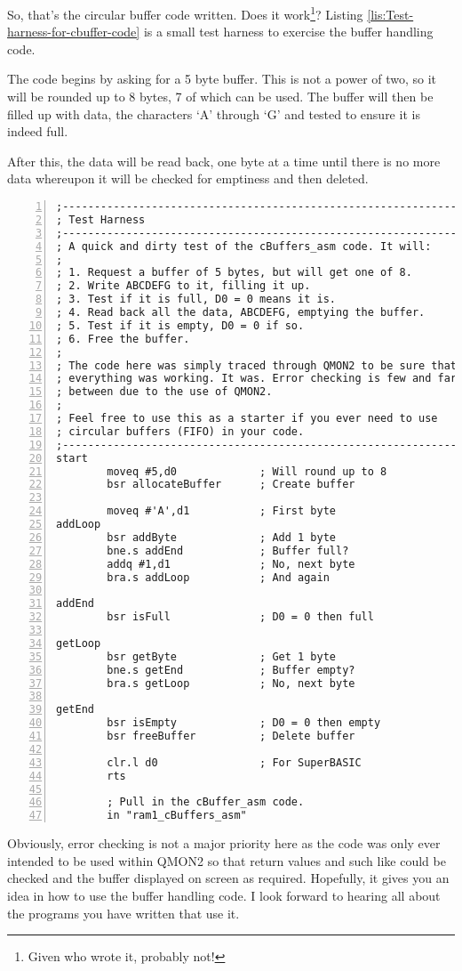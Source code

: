 So, that's the circular buffer code written. Does it work\footnote{Given who wrote it, probably not!}?
Listing \ref{lis:Test-harness-for-cbuffer-code} is a small test harness
to exercise the buffer handling code.

The code begins by asking for a 5 byte buffer. This is not a power
of two, so it will be rounded up to 8 bytes, 7 of which can be used.
The buffer will then be filled up with data, the characters `A'
through `G' and tested to ensure it is indeed full.

After this, the data will be read back, one byte at a time until there
is no more data whereupon it will be checked for emptiness and then
deleted. 

\begin{lstlisting}[caption={Test harness for cBuffer code},label={lis:Test-harness-for-cbuffer-code},numbers=left,showstringspaces=false,tabsize=4]
;--------------------------------------------------------------
; Test Harness
;--------------------------------------------------------------
; A quick and dirty test of the cBuffers_asm code. It will:
;
; 1. Request a buffer of 5 bytes, but will get one of 8.
; 2. Write ABCDEFG to it, filling it up.
; 3. Test if it is full, D0 = 0 means it is.
; 4. Read back all the data, ABCDEFG, emptying the buffer.
; 5. Test if it is empty, D0 = 0 if so.
; 6. Free the buffer.
;
; The code here was simply traced through QMON2 to be sure that
; everything was working. It was. Error checking is few and far
; between due to the use of QMON2. 
;
; Feel free to use this as a starter if you ever need to use
; circular buffers (FIFO) in your code.
;--------------------------------------------------------------
start
        moveq #5,d0             ; Will round up to 8
        bsr allocateBuffer      ; Create buffer

        moveq #'A',d1           ; First byte
addLoop
        bsr addByte             ; Add 1 byte
        bne.s addEnd            ; Buffer full?
        addq #1,d1              ; No, next byte
        bra.s addLoop           ; And again

addEnd
        bsr isFull              ; D0 = 0 then full

getLoop
        bsr getByte             ; Get 1 byte
        bne.s getEnd            ; Buffer empty?
        bra.s getLoop           ; No, next byte

getEnd
        bsr isEmpty             ; D0 = 0 then empty
        bsr freeBuffer          ; Delete buffer

        clr.l d0                ; For SuperBASIC
        rts

        ; Pull in the cBuffer_asm code.
        in "ram1_cBuffers_asm"

\end{lstlisting}

Obviously, error checking is not a major priority here as the code
was only ever intended to be used within QMON2 so that return values
and such like could be checked and the buffer displayed on screen
as required. Hopefully, it gives you an idea in how to use the buffer
handling code. I look forward to hearing all about the programs you
have written that use it. 
